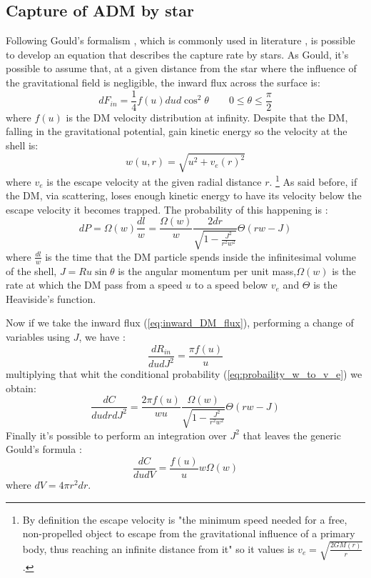 \subsection{Capture of ADM by star}
Following Gould's formalism \cite{Gould:1987ir,1985ApJ...296..679P}, which is commonly used in literature \cite{DMSun, Zentner_2009, Bottino_2002}, is possible to develop an equation that describes the capture rate by stars. As Gould, it's possible to assume that, at a given distance from the star where the influence of the gravitational field is negligible, the inward  flux across the surface is:
\begin{equation}
\label{eq:inward_DM_flux}
    dF_{in}=\frac{1}{4}f(u)du d\cos^2\theta \quad \quad 0\leq \theta \leq\frac{\pi}{2}
\end{equation}
where $f(u)$ is the DM velocity distribution at infinity. Despite that the DM, falling in the gravitational potential, gain kinetic energy so the velocity at the shell is:
\begin{equation*}
    w(u,r)=\sqrt{u^2+v_e(r)^2}
\end{equation*}
where $v_e$ is the escape velocity at the given radial distance $r$. \footnote{By definition the escape velocity is "the minimum speed needed for a free, non-propelled object to escape from the gravitational influence of a primary body, thus reaching an infinite distance from it" \cite{enwiki:escape_velocity} so it values is $v_e=\sqrt{\frac{2GM(r)}{r}}$. } As said before, if the DM, via scattering, loses enough kinetic energy to have its velocity below the escape velocity it becomes trapped. The probability of this happening is \cite{Gould:1987ir,Bottino_2002}:
\begin{equation}
\label{eq:probability_of_slowing}
dP=\Omega(w)\frac{dl}{w}=\frac{\Omega(w)}{w}\frac{2dr}{\sqrt{1-\frac{J^2}{r^2w^2}}}\Theta(rw-J)
\end{equation}
where $\frac{dl}{w}$ is the time that the DM particle spends inside the infinitesimal volume of the shell, $J=Ru\sin{\theta}$ is the angular momentum per unit mass,$\Omega(w)$ is the rate at which the DM pass from a speed $u$ to a speed below $v_e$ and $\Theta$ is the Heaviside's function.

Now if we take the inward flux (\ref{eq:inward_DM_flux}), performing a change of variables using $J$, we have \cite{Bottino_2002}:
\begin{equation*}
\frac{dR_{in}}{dudJ^2}=\frac{\pi f(u)}{u}    
\end{equation*}
multiplying that whit the conditional probability (\ref{eq:probaility_w_to_v_e}) we obtain:
\begin{equation*}
    \frac{dC}{dudrdJ^2}=\frac{2\pi f(u)}{wu}\frac{\Omega(w)}{\sqrt{1-\frac{J^2}{r^2w^2}}}\Theta(rw-J)
\end{equation*}
Finally it's possible to perform an integration over $J^2$ that leaves the generic Gould's formula \cite{Gould:1987ir, Bottino_2002}:
\begin{equation}
\label{eq:Differential_capture_rate}
    \frac{dC}{dudV}=\frac{f(u)}{u}w\Omega(w)
\end{equation}
where $dV=4\pi r^2 dr$.
